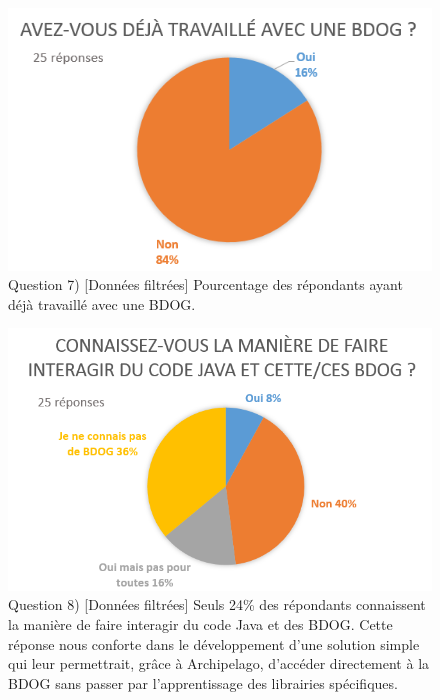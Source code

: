 \documentclass[a4paper,fleqn,12pt,oneside]{report}
\begin{document}
\begin{figure}[!ht]
\centering
\includegraphics[scale=0.8]{figures/QTravFilt.png}
\caption{Question 7) [Données filtrées] Pourcentage des répondants ayant déjà travaillé avec une BDOG.}
\label{fig:QTravFilt}
\end{figure}

\newpage
{}

\begin{figure}[!ht]
\centering
\includegraphics[scale=1]{figures/QLibJavaFilt.png}
\caption{Question 8) [Données filtrées] Seuls 24\% des répondants connaissent la manière de faire interagir du code Java et des BDOG. Cette réponse nous conforte dans le développement d'une solution simple qui leur permettrait, grâce à Archipelago, d'accéder directement à la BDOG sans passer par l'apprentissage des librairies spécifiques.}
\label{fig:QLibJavaFilt}
\end{figure}
\end{document}
